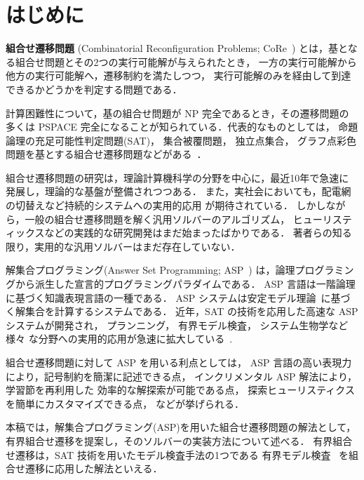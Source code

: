 ﻿%
\section{はじめに}\label{chap:introduction}

\textbf{組合せ遷移問題}
(Combinatorial Reconfiguration Problems;
CoRe~\cite{core:ItoDHPSUU11,core:Nishimura18,core:Heuvel13})
とは，基となる組合せ問題とその2つの実行可能解が与えられたとき，
一方の実行可能解から他方の実行可能解へ，遷移制約を満たしつつ，
実行可能解のみを経由して到達できるかどうかを判定する問題である．

計算困難性について，基の組合せ問題が NP 完全であるとき，その遷移問題の
多くは PSPACE 完全になることが知られている．代表的なものとしては，
命題論理の充足可能性判定問題(SAT)，
集合被覆問題，
独立点集合，
グラフ点彩色問題を基とする組合せ遷移問題などがある~\cite{%
  core:gcp:BonsmaC09,%
  core:gcp:CerecedaHJ11,%
  core:sat:GopalanKMP09,%
  core:ItoDHPSUU11%
}．

組合せ遷移問題の研究は，理論計算機科学の分野を中心に，最近10年で急速に
発展し，理論的な基盤が整備されつつある．
また，実社会においても，配電網の切替えなど持続的システムへの実用的応用
が期待されている．
しかしながら，一般の組合せ遷移問題を解く汎用ソルバーのアルゴリズム，
ヒューリスティックスなどの実践的な研究開発はまだ始まったばかりである．
著者らの知る限り，実用的な汎用ソルバーはまだ存在していない．

解集合プログラミング(Answer Set Programming; ASP~\cite{%
Baral03:cambridge,%
Gelfond88:iclp,%
Inoue08:jssst,%
Niemela99:amai})
は，論理プログラミングから派生した宣言的プログラミングパラダイムである．
ASP 言語は一階論理に基づく知識表現言語の一種である．
ASP システムは安定モデル理論~\cite{Gelfond88:iclp}に基づく解集合を計算するシステムである．
近年，SAT の技術を応用した高速な ASP システムが開発され，
プランニング，
有界モデル検査，
システム生物学など様々
な分野への実用的応用が急速に拡大している~\cite{Erdem16:AI}.

組合せ遷移問題に対して ASP を用いる利点としては，
ASP 言語の高い表現力により，記号制約を簡潔に記述できる点，
インクリメンタル ASP 解法により，学習節を再利用した
効率的な解探索が可能である点，
探索ヒューリスティクスを簡単にカスタマイズできる点，
などが挙げられる．

本稿では，解集合プログラミング(ASP)を用いた組合せ遷移問題の解法として，
有界組合せ遷移を提案し，そのソルバーの実装方法について述べる．
有界組合せ遷移は，SAT 技術を用いたモデル検査手法の1つである
有界モデル検査~\cite{%
  JSAI:BanbaraT10,DBLP:series/faia/Biere09,DBLP:conf/tacas/BiereCCZ99}%
を組合せ遷移に応用した解法といえる．

